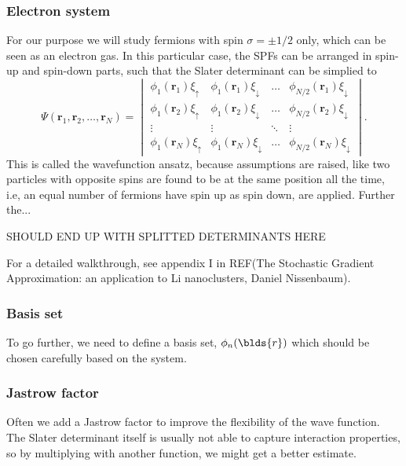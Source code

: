 \subsubsection{Electron system} \label{subsubsec:electronsystem}
For our purpose we will study fermions with spin $\sigma=\pm 1/2$ only, which can be seen as an electron gas. In this particular case, the SPFs can be arranged in spin-up and spin-down parts, such that the Slater determinant can be simplied to 
\begin{equation}
\Psi(\boldsymbol{r}_1,\boldsymbol{r}_2,\hdots,\boldsymbol{r}_N)=
\begin{vmatrix}
\phi_1(\boldsymbol{r}_1)\xi_{\uparrow} & \phi_1(\boldsymbol{r}_1)\xi_{\downarrow} & \hdots & \phi_{N/2}(\boldsymbol{r}_1)\xi_{\downarrow}\\
\phi_1(\boldsymbol{r}_2)\xi_{\uparrow} & \phi_1(\boldsymbol{r}_2)\xi_{\downarrow} & \hdots & \phi_{N/2}(\boldsymbol{r}_2)\xi_{\downarrow}\\
\vdots & \vdots & \ddots & \vdots \\
\phi_1(\boldsymbol{r}_N)\xi_{\uparrow} & \phi_1(\boldsymbol{r}_N)\xi_{\downarrow} & \hdots & \phi_{N/2}(\boldsymbol{r}_N)\xi_{\downarrow}
\end{vmatrix}.
\end{equation}
This is called the wavefunction ansatz, because assumptions are raised, like two particles with opposite spins are found to be at the same position all the time, i.e, an equal number of fermions have spin up as spin down, are applied. Further the...

SHOULD END UP WITH SPLITTED DETERMINANTS HERE

For a detailed walkthrough, see appendix I in REF(The Stochastic Gradient Approximation: an application to Li nanoclusters, Daniel Nissenbaum). 

\subsubsection{Basis set} \label{subsubsec:basisset}
To go further, we need to define a basis set, $\phi_n(\blds{r})$ which should be chosen carefully based on the system. 

\subsubsection{Jastrow factor} \label{subsubsec:jastrow}
Often we add a Jastrow factor to improve the flexibility of the wave function. The Slater determinant itself is usually not able to capture interaction properties, so by multiplying with another function, we might get a better estimate. 


